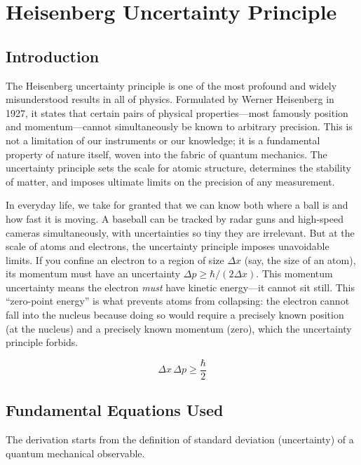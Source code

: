 \chapter{Heisenberg Uncertainty Principle}

\section*{Introduction}

The Heisenberg uncertainty principle is one of the most profound and widely misunderstood results in all of physics. Formulated by Werner Heisenberg in 1927, it states that certain pairs of physical properties---most famously position and momentum---cannot simultaneously be known to arbitrary precision. This is not a limitation of our instruments or our knowledge; it is a fundamental property of nature itself, woven into the fabric of quantum mechanics. The uncertainty principle sets the scale for atomic structure, determines the stability of matter, and imposes ultimate limits on the precision of any measurement.

In everyday life, we take for granted that we can know both where a ball is and how fast it is moving. A baseball can be tracked by radar guns and high-speed cameras simultaneously, with uncertainties so tiny they are irrelevant. But at the scale of atoms and electrons, the uncertainty principle imposes unavoidable limits. If you confine an electron to a region of size $\Delta x$ (say, the size of an atom), its momentum must have an uncertainty $\Delta p \geq \hbar/(2\Delta x)$. This momentum uncertainty means the electron \emph{must} have kinetic energy---it cannot sit still. This ``zero-point energy'' is what prevents atoms from collapsing: the electron cannot fall into the nucleus because doing so would require a precisely known position (at the nucleus) and a precisely known momentum (zero), which the uncertainty principle forbids.


\begin{equation}
\Delta x\,\Delta p \geq \frac{\hbar}{2}
\end{equation}

\section*{Fundamental Equations Used}

The derivation starts from the definition of standard deviation (uncertainty) of a quantum mechanical observable.


